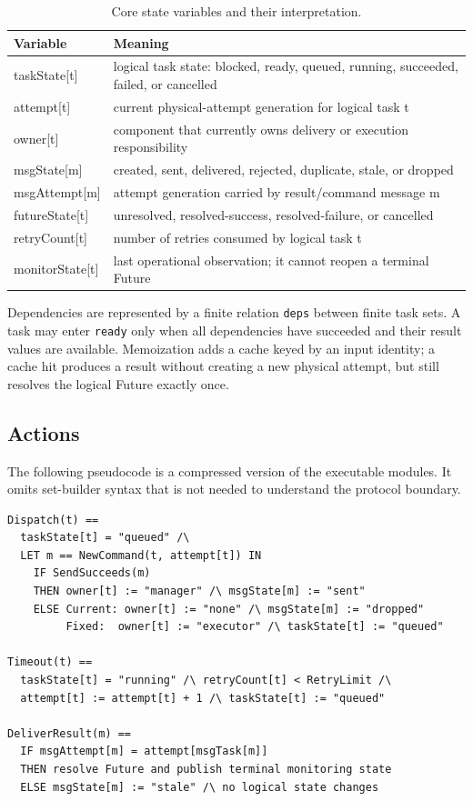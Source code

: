 \documentclass[11pt,a4paper]{article}
\newenvironment{tabularx}[2]{\begin{tabular}{#2}}{\end{tabular}}
\begin{document}
\begin{table}[h]
\centering
\caption{Core state variables and their interpretation.}
\label{tab:variables}
\normalsize
\begin{tabularx}{\textwidth}{>{\ttfamily\raggedright\arraybackslash}p{0.25\textwidth} X}
\toprule
Variable & Meaning \\
\midrule
taskState[t] & logical task state: blocked, ready, queued, running, succeeded, failed, or cancelled \\
attempt[t] & current physical-attempt generation for logical task t \\
owner[t] & component that currently owns delivery or execution responsibility \\
msgState[m] & created, sent, delivered, rejected, duplicate, stale, or dropped \\
msgAttempt[m] & attempt generation carried by result/command message m \\
futureState[t] & unresolved, resolved-success, resolved-failure, or cancelled \\
retryCount[t] & number of retries consumed by logical task t \\
monitorState[t] & last operational observation; it cannot reopen a terminal Future \\
\bottomrule
\end{tabularx}
\end{table}

Dependencies are represented by a finite relation \texttt{deps} between finite task sets. A task may
enter \texttt{ready} only when all dependencies have succeeded and their result values are
available. Memoization adds a cache keyed by an input identity; a cache hit produces a result
without creating a new physical attempt, but still resolves the logical Future exactly once.

\subsection{Actions}
The following pseudocode is a compressed version of the executable modules. It omits set-builder
syntax that is not needed to understand the protocol boundary.

\begin{lstlisting}[language={},caption={Core Current/Fixed protocol actions.}]
Dispatch(t) ==
  taskState[t] = "queued" /\
  LET m == NewCommand(t, attempt[t]) IN
    IF SendSucceeds(m)
    THEN owner[t] := "manager" /\ msgState[m] := "sent"
    ELSE Current: owner[t] := "none" /\ msgState[m] := "dropped"
         Fixed:  owner[t] := "executor" /\ taskState[t] := "queued"

Timeout(t) ==
  taskState[t] = "running" /\ retryCount[t] < RetryLimit /\
  attempt[t] := attempt[t] + 1 /\ taskState[t] := "queued"

DeliverResult(m) ==
  IF msgAttempt[m] = attempt[msgTask[m]]
  THEN resolve Future and publish terminal monitoring state
  ELSE msgState[m] := "stale" /\ no logical state changes
\end{lstlisting}
\end{document}
